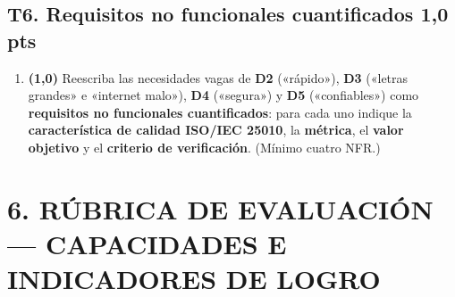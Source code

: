 \documentclass[11pt]{article}
\newcommand{\pts}[1]{\hfill{\normalsize\textbf{\textcolor{utegreendk}{#1 pts}}}}
\begin{document}
\subsection*{T6. Requisitos no funcionales cuantificados \pts{1{,}0}}

\begin{enumerate}[label=\textbf{T6.\arabic*},leftmargin=26pt,itemsep=3pt]
  \item \textbf{(1{,}0)} Reescriba las necesidades vagas de \textbf{D2} («rápido»), \textbf{D3} («letras grandes» e «internet malo»), \textbf{D4} («segura») y \textbf{D5} («confiables») como \textbf{requisitos no funcionales cuantificados}: para cada uno indique la \textbf{característica de calidad ISO/IEC 25010}, la \textbf{métrica}, el \textbf{valor objetivo} y el \textbf{criterio de verificación}. (Mínimo cuatro NFR.)
\end{enumerate}

\newpage
\section*{\textcolor{utegreendk}{6. RÚBRICA DE EVALUACIÓN — CAPACIDADES E INDICADORES DE LOGRO}}
\end{document}
